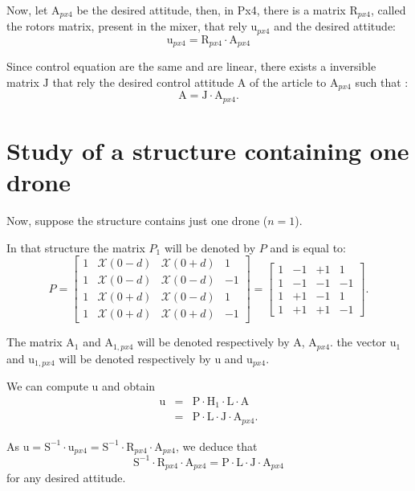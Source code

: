 \documentclass[a4paper]{article}
\newcommand{\UB}[1]{ \bm{\mathrm{#1}} }
\begin{document}
Now, let $\UB{A}_{px4}$ be the desired attitude, then, in Px4, there is a matrix 
$\UB{R}_{px4}$, called the rotors matrix, present in the mixer, that rely $\UB{u}_{px4}$ and the desired attitude:
$$
\UB{u}_{px4} = \UB{R}_{px4} \cdot \UB{A}_{px4}
$$

Since control equation are the same and are linear, there exists a inversible matrix $\UB{J}$ that rely the desired control attitude $\UB{A}$ of the article to 
$\UB{A}_{px4}$ such that :
$$
\UB{A} = \UB{J} \cdot \UB{A}_{px4}.
$$

\section{Study of a structure containing one drone}

Now, suppose the structure contains just one drone ($n=1$).

In that structure the matrix $P_1$ will be denoted by $P$ and is equal to:
$$
P
=
\left[
\begin{array}{cccc}
1 & \mathcal{X}(0 - d) & \mathcal{X}(0 + d) &  1  \\
1 & \mathcal{X}(0 - d) & \mathcal{X}(0 - d) & -1  \\
1 & \mathcal{X}(0 + d) & \mathcal{X}(0 - d) &  1  \\
1 & \mathcal{X}(0 + d) & \mathcal{X}(0 + d) & -1 
\end{array}
\right]
=
\left[
\begin{array}{cccc}
1 & -1 & +1 &  1  \\
1 & -1 & -1 & -1  \\
1 & +1 & -1 &  1  \\
1 & +1 & +1 & -1
\end{array}
\right].
$$

The matrix $\UB{A}_{1}$ and $\UB{A}_{1,px4}$
will be denoted respectively by $\UB{A}$,
$\UB{A}_{px4}$.
the vector $\UB{u}_{1}$ and 
$\UB{u}_{1,px4}$ will be denoted respectively by $\UB{u}$ and $\UB{u}_{px4}$.

We can compute $\UB{u}$ and obtain
$$
\begin{array}{rcl}
\UB{u}
& = &
\UB{P}
\cdot
\UB{H}_1
\cdot
\UB{L}
\cdot
\UB{A} \\
& = &
\UB{P}
\cdot
\UB{L}
\cdot
\UB{J}
\cdot
\UB{A}_{px4}.
\end{array}
$$

As $
\UB{u}
=
\UB{S}^{-1}
\cdot
\UB{u}_{px4} 
=
\UB{S}^{-1}
\cdot
\UB{R}_{px4}
\cdot
\UB{A}_{px4}
$, we deduce that 
$$
\UB{S}^{-1}
\cdot
\UB{R}_{px4}
\cdot
\UB{A}_{px4}
=
\UB{P}
\cdot
\UB{L}
\cdot
\UB{J}
\cdot
\UB{A}_{px4}
$$ for any desired attitude.
\end{document}
